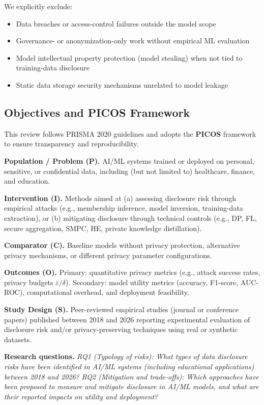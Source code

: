 \documentclass[conference]{IEEEtran}
\begin{document}
We explicitly exclude:
\begin{itemize}
  \item Data breaches or access-control failures outside the model scope
  \item Governance- or anonymization-only work without empirical ML evaluation
  \item Model intellectual property protection (model stealing) when not tied to training-data disclosure
  \item Static data storage security mechanisms unrelated to model leakage
\end{itemize}

\subsection{Objectives and PICOS Framework}
This review follows PRISMA 2020 guidelines and adopts the \textbf{PICOS} framework to ensure transparency and reproducibility.

\noindent\textbf{Population / Problem (P).} AI/ML systems trained or deployed on personal, sensitive, or confidential data, including (but not limited to) healthcare, finance, and education.

\noindent\textbf{Intervention (I).} Methods aimed at (a) assessing disclosure risk through empirical attacks (e.g., membership inference, model inversion, training-data extraction), or (b) mitigating disclosure through technical controls (e.g., DP, FL, secure aggregation, SMPC, HE, private knowledge distillation).

\noindent\textbf{Comparator (C).} Baseline models without privacy protection, alternative privacy mechanisms, or different privacy parameter configurations.

\noindent\textbf{Outcomes (O).} Primary: quantitative privacy metrics (e.g., attack success rates, privacy budgets $\varepsilon/\delta$). Secondary: model utility metrics (accuracy, F1-score, AUC-ROC), computational overhead, and deployment feasibility.

\noindent\textbf{Study Design (S).} Peer-reviewed empirical studies (journal or conference papers) published between 2018 and 2026 reporting experimental evaluation of disclosure risk and/or privacy-preserving techniques using real or synthetic datasets.

\noindent\textbf{Research questions.}
\textit{RQ1 (Typology of risks): What types of data disclosure risks have been identified in AI/ML systems (including educational applications) between 2018 and 2026?}
\textit{RQ2 (Mitigation and trade-offs): Which approaches have been proposed to measure and mitigate disclosure in AI/ML models, and what are their reported impacts on utility and deployment?}
\end{document}
